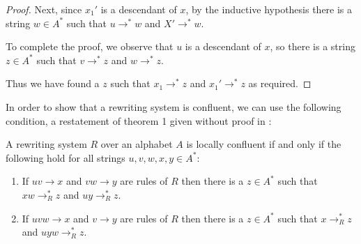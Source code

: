 \documentclass[noindex,noinsetproof,emphthm,12pt]{lmaths}
\begin{document}
\begin{proof}
	Next, since $x_1'$ is a descendant of $x$, by the inductive hypothesis there is a string $w \in A^*$ such that $u \to^* w$ and $X' \to^* w$.

	{\centering
	\par}

	To complete the proof, we observe that $u$ is a descendant of $x$, so there is a string $z \in A^*$ such that $v \to^* z$ and $w \to^* z$.

	{\centering
	\par}

	Thus we have found a $z$ such that $x_1 \to^* z$ and $x_1' \to^* z$ as required.
\end{proof}

In order to show that a rewriting system is confluent, we can use the following condition, a restatement of theorem 1 given without proof in \cite{McNaughton1987}:
\begin{theorem} \label{thm:confluent-cond}
	A rewriting system $R$ over an alphabet $A$ is locally confluent if and only if the following hold for all strings $u, v, w, x, y \in A^*$:
	\begin{enumerate}[(1)]
		\item \label{it:conf-overlap} If $uv \to x$ and $vw \to y$ are rules of $R$ then there is a $z \in A^*$ such that $xw \to^*_R z$ and $uy \to^*_R z$.
		\item \label{it:conf-middle} If $uvw \to x$ and $v \to y$ are rules of $R$ then there is a $z \in A^*$ such that $x \to^*_R z$ and $uyw \to^*_R z$.
	\end{enumerate}
\end{theorem}
\end{document}
